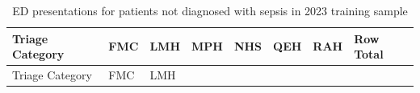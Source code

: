 \documentclass[
  a4paper,
  ,captions=tableheading
]{scrartcl}
\begin{document}
\begin{longtable}[]{@{}
  >{\raggedright\arraybackslash}p{}
  >{\raggedleft\arraybackslash}p{}
  >{\raggedleft\arraybackslash}p{}
  >{\raggedleft\arraybackslash}p{}
  >{\raggedleft\arraybackslash}p{}
  >{\raggedleft\arraybackslash}p{}
  >{\raggedleft\arraybackslash}p{}
  >{\raggedleft\arraybackslash}p{}@{}}
\caption{\label{tbl:hospitals_no_sepsis_2023}ED presentations for
patients not diagnosed with sepsis in 2023 training
sample}\tabularnewline
\toprule\noalign{}
\begin{minipage}[b]{\linewidth}\raggedright
Triage Category
\end{minipage} & \begin{minipage}[b]{\linewidth}\raggedleft
FMC
\end{minipage} & \begin{minipage}[b]{\linewidth}\raggedleft
LMH
\end{minipage} & \begin{minipage}[b]{\linewidth}\raggedleft
MPH
\end{minipage} & \begin{minipage}[b]{\linewidth}\raggedleft
NHS
\end{minipage} & \begin{minipage}[b]{\linewidth}\raggedleft
QEH
\end{minipage} & \begin{minipage}[b]{\linewidth}\raggedleft
RAH
\end{minipage} & \begin{minipage}[b]{\linewidth}\raggedleft
Row Total
\end{minipage} \\
\midrule\noalign{}
\endfirsthead
\toprule\noalign{}
\begin{minipage}[b]{\linewidth}\raggedright
Triage Category
\end{minipage} & \begin{minipage}[b]{\linewidth}\raggedleft
FMC
\end{minipage} & \begin{minipage}[b]{\linewidth}\raggedleft
LMH
\end{minipage} & \begin{minipage}[b]{\linewidth}\raggedleft

\end{minipage}
\end{longtable}
\end{document}
